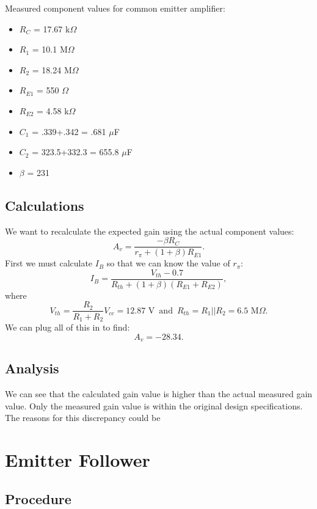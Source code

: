 \documentclass[12pt,letterpaper]{report}
\begin{document}
Measured component values for common emitter amplifier:
\begin{itemize}
\item $R_C$ = 17.67 k$\Omega$
\item $R_1$ = 10.1 M$\Omega$
\item $R_2$ = 18.24 M$\Omega$
\item $R_{E1}$ = 550 $\Omega$
\item $R_{E2}$ = 4.58 k$\Omega$
\item $C_1$ = .339+.342 = .681 $\mu$F
\item $C_2$ = 323.5+332.3 = 655.8 $\mu$F
\item $\beta$ = 231
\end{itemize}



\subsection*{Calculations}

We want to recalculate the expected gain using the actual component values:
$$
A_v = \frac{-\beta R_C}{r_{\pi}+(1+\beta)R_{E1}}.
$$
First we must calculate $I_B$ so that we can know the value of $r_{\pi}$:
$$
I_B = \frac{V_{th}-0.7}{R_{th}+(1+\beta)(R_{E1}+R_{E2})},
$$
where
$$
V_{th} = \frac{R_2}{R_1+R_2}V_{cc} = 12.87 \text{ V}\, \text{ and } \, 
R_{th} = R_1||R_2 = 6.5 \text{ M}\Omega.
$$
We can plug all of this in to find:
$$
A_v = -28.34.
$$

\subsection*{Analysis}

We can see that the calculated gain value is higher than the actual measured gain value. Only the measured gain value is within the original design specifications. The reasons for this discrepancy could be 

\section*{Emitter Follower}
\subsection*{Procedure}
\end{document}
